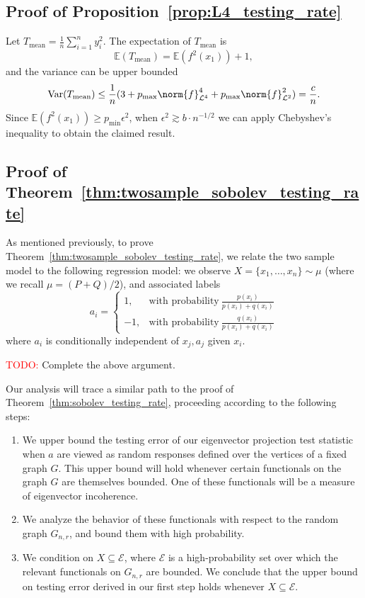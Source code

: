 \documentclass{article}
\newcommand{\Var}{\mathrm{Var}}
\newcommand{\1}{\mathbf{1}}
\newcommand{\Leb}{\mathcal{L}}
\newcommand{\Ebb}{\mathbb{E}}
\theoremstyle{alden}
\theoremstyle{aldenthm}
\theoremstyle{definition}
\theoremstyle{remark}
\begin{document}
\subsection{Proof of Proposition~\ref{prop:L4_testing_rate}}
Let $T_{\mathrm{mean}} = \frac{1}{n}\sum_{i = 1}^{n} y_i^2$. The expectation of $T_{\mathrm{mean}}$ is
\begin{equation*}
\Ebb(T_{\mathrm{mean}}) = \mathbb{E}(f^2(x_1)) + 1,
\end{equation*}
and the variance can be upper bounded
\begin{equation*}
\Var(T_{\mathrm{mean}}) \leq \frac{1}{n}(3 + p_{\max} \norm{f}_{\Leb^4}^4 + p_{\max}\norm{f}_{\Leb^2}^2) = \frac{c}{n}.
\end{equation*}
Since $\mathbb{E}(f^2(x_1)) \geq p_{\min} \epsilon^2$, when $\epsilon^2 \gtrsim b\cdot n^{-1/2}$ we can apply Chebyshev's inequality to obtain the claimed result.

\subsection{Proof of Theorem~\ref{thm:twosample_sobolev_testing_rate}}

As mentioned previously, to prove Theorem~\ref{thm:twosample_sobolev_testing_rate}, we relate the two sample model to the following regression model: we observe
$X = \{x_1,\ldots,x_n\} \sim \mu$ (where we recall $\mu = (P + Q)/2$), and associated labels
\begin{equation*}
a_i = 
\begin{cases}
1, & \textrm{with probability}~ \frac{p(x_i)}{p(x_i) + q(x_i)} \\
-1, & \textrm{with probability}~ \frac{q(x_i)}{p(x_i) + q(x_i)}
\end{cases}
\end{equation*}
where $a_i$ is conditionally independent of $x_j,a_j$ given $x_i$. 

\textcolor{red}{TODO:} Complete the above argument.

Our analysis will trace a similar path to the proof of Theorem~\ref{thm:sobolev_testing_rate}, proceeding according to the following steps:
\begin{enumerate}
	\item We upper bound the testing error of our eigenvector projection test statistic when $a$ are viewed as random responses defined over the vertices of a fixed graph $G$. This upper bound will hold whenever certain functionals on the graph $G$ are themselves bounded. One of these functionals will be a measure of eigenvector incoherence.
	\item We analyze the behavior of these functionals with respect to the random graph $G_{n,r}$, and bound them with high probability.
	\item We condition on $X \subseteq \mathcal{E}$, where $\mathcal{E}$ is a high-probability set over which the relevant functionals on $G_{n,r}$ are bounded. We conclude that the upper bound on testing error derived in our first step holds whenever $X \subseteq \mathcal{E}$. 
\end{enumerate}
\end{document}
